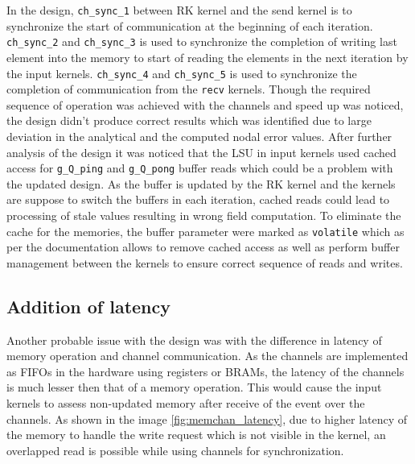 In the design, \texttt{ch\_sync\_1} between RK kernel and the send kernel is to synchronize
the start of communication at the beginning of each iteration. \texttt{ch\_sync\_2} and
\texttt{ch\_sync\_3} is used to synchronize the completion of writing last element into
the memory to start of reading the elements in the next iteration by the input kernels.
\texttt{ch\_sync\_4} and \texttt{ch\_sync\_5} is used to synchronize the completion
of communication from the \texttt{recv} kernels. Though the required sequence of operation
was achieved with the channels and speed up was noticed, the design didn't produce correct
results which was identified due to large deviation in the analytical and the computed
nodal error values. After further analysis of the design it was noticed that the
\acl{LSU} in input kernels used cached access for \texttt{g\_Q\_ping} and \texttt{g\_Q\_pong}
buffer reads which could be a problem with the updated design. As the buffer is updated by the
RK kernel and the kernels are suppose to switch the buffers in each iteration, cached reads
could lead to processing of stale values resulting in wrong field computation. To eliminate
the cache for the memories, the buffer parameter were marked as \texttt{volatile} which
as per the documentation allows to remove cached access as well as perform buffer management
between the kernels to ensure correct sequence of reads and writes.

\subsection*{Addition of latency}

Another probable issue with the design was with the difference in latency of memory operation
and channel communication. As the channels are implemented as FIFOs in the hardware
using registers or BRAMs, the latency of the channels is much lesser then that of a memory
operation. This would cause the input kernels to assess non-updated memory after receive of the
event over the channels. As shown in the image \ref{fig:memchan_latency}, due to higher latency
of the memory to handle the write request which is not visible in the kernel, an overlapped
read is possible while using channels for synchronization.


